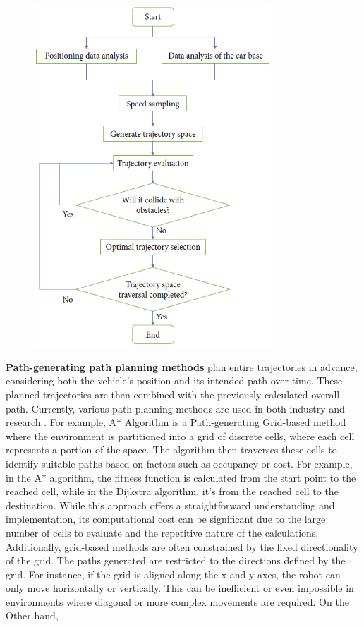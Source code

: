 \begin{figure}[H] 
\centering  
\includegraphics[width=3.5in]{images/Chap1/DWA_flowchart.png}  
\label{flowchart of the DWA}  
\end{figure}

\textbf{Path-generating path planning methods} plan entire trajectories in advance, considering both the 
vehicle's position and its intended path over time. These planned trajectories are then combined with 
the previously calculated overall path. Currently, various path planning methods are used in both industry 
and research \cite{R28}.
For example, A* Algorithm is a Path-generating Grid-based method where
the environment is partitioned into a grid of discrete cells, where each cell represents a 
portion of the space. 
The algorithm then traverses these cells to identify suitable paths based on factors such as occupancy 
or cost. For example, in the A* algorithm, the fitness function is calculated from the start point 
to the reached cell, while in the Dijkstra algorithm, it's from the reached cell to the destination. 
While this approach offers a straightforward understanding and implementation, its computational cost 
can be significant due to the large number of cells to evaluate and the repetitive nature of the 
calculations. Additionally, grid-based methods are often constrained by the fixed directionality 
of the grid. The paths generated are restricted to the directions defined by the grid. 
For instance, if the grid is aligned along the x and y axes, the robot can only move horizontally 
or vertically. This can be inefficient or even impossible in environments where diagonal 
or more complex movements are required.
On the Other hand, 

